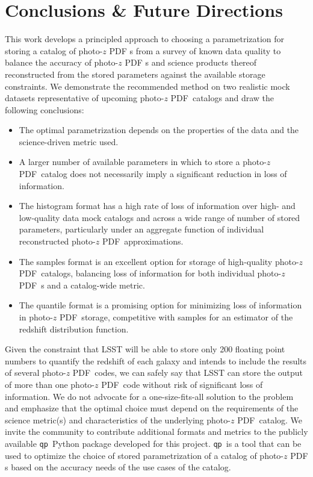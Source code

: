 \documentclass[\docopts]{\docclass}
\newcommand{\qp}{\texttt{qp}\xspace}
\newcommand{\pz}{photo-$z$ PDF\xspace}
\begin{document}
\section{Conclusions \& Future Directions}
\label{sec:conclusions}


This work develops a principled approach to choosing a parametrization for 
storing a catalog of \pz s from a survey of known data quality to balance the 
accuracy of \pz s and science products thereof reconstructed from the stored 
parameters against the available storage constraints.
We demonstrate the recommended method on two realistic mock datasets 
representative of upcoming \pz\ catalogs and draw the following conclusions:
\begin{itemize}
  \item The optimal parametrization depends on the properties of the data and 
the science-driven metric used.
  \item A larger number of available parameters in which to store a \pz\ 
catalog does not necessarily imply a significant reduction in loss of 
information.
  \item The histogram format has a high rate of loss of information over high- 
and low-quality data mock catalogs and across a wide range of number of stored 
parameters, particularly under an aggregate function of individual 
reconstructed \pz\ approximations.
  \item The samples format is an excellent option for storage of high-quality 
\pz\ catalogs, balancing loss of information for both individual \pz\ s and a 
catalog-wide metric.
  \item The quantile format is a promising option for minimizing loss of 
information in \pz\ storage, competitive with samples for an estimator of the 
redshift distribution function.
\end{itemize}

Given the constraint that LSST will be able to store only 200 floating point 
numbers to quantify the redshift of each galaxy and intends to include the 
results of several \pz\ codes, we can safely say that LSST can store the output 
of more than one \pz\ code without risk of significant loss of information.
We do not advocate for a one-size-fits-all solution to the problem and 
emphasize that the optimal choice must depend on the requirements of the 
science metric(s) and characteristics of the underlying \pz\ catalog.
We invite the community to contribute additional formats and metrics to the 
publicly available \qp\ Python package developed for this project.  \qp\ is a 
tool that can be used to optimize the choice of stored parametrization of a 
catalog of \pz s based on the accuracy needs of the use cases of the catalog.
\end{document}
